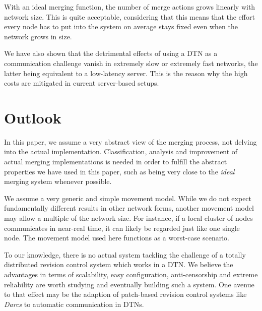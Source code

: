 \documentclass[letterpaper,conference]{IEEEtran}
\begin{document}
With an ideal merging function, the number of merge actions grows linearly with network size. This is quite acceptable, considering that this means that the effort every node has to put into the system on average stays fixed even when the network grows in size.

We have also shown that the detrimental effects of using a DTN as a communication challenge vanish in extremely slow or extremely fast networks, the latter being equivalent to a low-latency server. This is the reason why the high costs are mitigated in current server-based setups.

\section{Outlook}

In this paper, we assume a very abstract view of the merging process, not delving into the actual implementation. Classification, analysis and improvement of actual merging implementations is needed in order to fulfill the abstract properties we have used in this paper, such as being very close to the \textit{ideal} merging system whenever possible.

We assume a very generic and simple movement model. While we do not expect fundamentally different results in other network forms, another movement model may allow a multiple of the network size. For instance, if a local cluster of nodes communicates in near-real time, it can likely be regarded just like one single node. The movement model used here functions as a worst-case scenario.

To our knowledge, there is no actual system tackling the challenge of a totally distributed revision control system which works in a DTN. We believe the advantages in terms of scalability, easy configuration, anti-censorship and extreme reliability are worth studying and eventually building such a system. One avenue to that effect may be the adaption of patch-based revision control systems like \textit{Darcs}\cite{roundy2005darcs} to automatic communication in DTNs.
\end{document}
